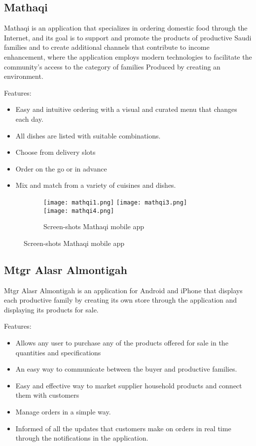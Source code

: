 \documentclass[11pt]{article}
\newcommand\tab[1][1cm]{\hspace*{#1}}
\begin{document}
\subsection{Mathaqi}
\tab Mathaqi is an application that specializes in ordering domestic food through the Internet, and its goal is to support and promote the products of productive Saudi families and to create additional channels that contribute to income enhancement, where the application employs modern technologies to facilitate the community’s access to the category of families Produced by creating an environment.

Features:

\begin{itemize}
\item Easy and intuitive ordering with a visual and curated menu that changes each day.
\item All dishes are listed with suitable combinations.
\item Choose from delivery slots
\item Order on the go or in advance
\item Mix and match from a variety of cuisines and dishes.
\end{itemize}


\begin{figure}
  \begin{subfigure}{\linewidth}
  \texttt{[image: mathqi1.png]}\hfill
    \texttt{[image: mathqi3.png]}\hfill
  \texttt{[image: mathqi4.png]}
  \caption{Screen-shots Mathaqi mobile app}
  \label{fig:mathaqi}
  \end{subfigure}
\end{figure}

\clearpage 
\newpage 

\subsection{Mtgr Alasr Almontigah}

\tab Mtgr Alasr Almontigah is an application for Android and iPhone that displays each productive family by creating its own store through the application and displaying its products for sale.

Features:


\begin{itemize}
\item Allows any user to purchase any of the products offered for sale in the quantities and specifications
\item An easy way to communicate between the buyer and productive families.
\item Easy and effective way to market supplier household products and connect them with customers
\item Manage  orders in a simple way.
\item Informed of all the updates that customers make on orders in real time through the notifications in the application.
\end{itemize}
\end{document}
